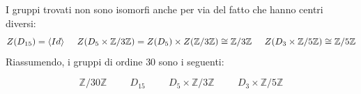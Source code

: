 \documentclass[12pt]{scrartcl}
\theoremstyle{style}
\newenvironment{boxenv}[1][]{
    \begin{eqbox}[#1]
    }{
   \end{eqbox}
}
\numberwithin{equation}{subsection}
\begin{document}
I gruppi trovati non sono isomorfi anche per via del fatto che hanno centri diversi:
\[
Z(D_{15}) = \langle Id \rangle \hspace{.5cm}Z(D_5\times \mathbb{Z}/3\mathbb{Z}) = Z(D_5) \times Z(\mathbb{Z}/3\mathbb{Z}) \cong \mathbb{Z}/3\mathbb{Z} \hspace{.5cm}Z(D_3\times \mathbb{Z}/5\mathbb{Z}) \cong \mathbb{Z}/5\mathbb{Z}
\] 
Riassumendo, i gruppi di ordine $30$ sono i seguenti:
\begin{boxenv}[]
\[
\mathbb{Z}/30\mathbb{Z} \hspace{1cm}D_{15}\hspace{1cm}D_5 \times \mathbb{Z}/3\mathbb{Z} \hspace{1cm}D_3 \times \mathbb{Z}/5\mathbb{Z}
\] 
\end{boxenv}

\newpage
\end{document}
